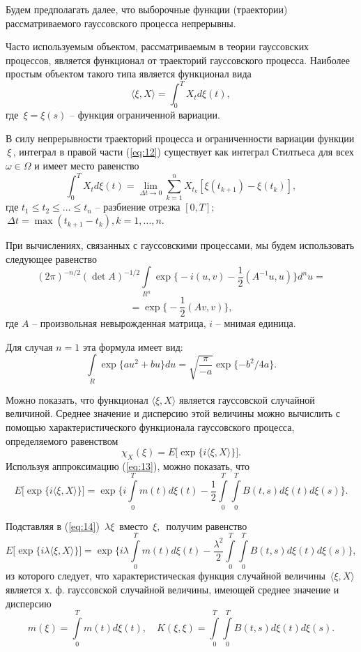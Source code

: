 \documentclass [12pt]{report}
\begin{document}
Будем предполагать далее, что выборочные функции (траектории) рассматриваемого
гауссовского процесса непрерывны.

  Часто используемым объектом, рассматриваемым в теории гауссовских процессов, является функционал
от траекторий гауссовского процесса. Наиболее простым
объектом такого типа является  функционал вида
\begin{equation}\label{eq:12}
\langle\xi,X\rangle=\int_0^T X_t d\xi(t),
\end{equation}
где $\,\xi=\xi(s)$ -- функция ограниченной вариации.

  В силу непрерывности траекторий
процесса и ограниченности вариации функции $\,\xi\,$, интеграл в правой
части (\ref{eq:12}) существует как интеграл Стилтьеса для всех $\omega\in \Omega$
и имеет место равенство
\begin{equation}\label{eq:13}
\int_0^T X_t d\xi(t)=\lim\limits_{\Delta t\rightarrow 0}
\sum\limits_{k=1}^n X_{t_k}[\xi(t_{k+1})-\xi(t_k)],
\end{equation}
где $t_1\leq t_2\leq\ldots\leq t_n$ -- разбиение отрезка $[0,T];$
$\,\Delta t=\max(t_{k+1}-t_k), k=1,\ldots,n.$

При вычислениях, связанных с гауссовскими процессами, мы будем использовать
следующее равенство
$$(2\pi)^{-n/2}(\det A)^{-1/2}
\int\limits_{R^n}\exp\Big\{-i(u,v)-\frac{1}{2}(A^{-1}u,u)\Big\} d^n u=$$
$$=\exp\Big\{-\frac{1}{2}(Av,v)\Big\},$$
где $A$ -- произвольная невырожденная матрица, $i$ -- мнимая единица.

Для случая $n=1$ эта формула имеет вид:
$$\int\limits_R \exp\{au^2+bu\}du=
\sqrt{\frac{\pi}{-a}}\exp\{-b^2/4a\}.$$

Можно показать, что функционал $\langle\xi,X\rangle$ является гауссовской
случайной величиной. Среднее значение и дисперсию этой величины
можно вычислить с помощью характеристического функционала гауссовского
процесса, определяемого равенством
$$\chi_X(\xi)=E\Big[\exp\Big\{i\langle\xi,X\rangle\Big\}\Big].$$
Используя аппроксимацию (\ref{eq:13}), можно показать, что
\begin{equation}\label{eq:14}
E\Big[\exp\Big\{i\langle\xi,X\rangle\Big\}\Big]=\exp\Big\{
i\int\limits_0^T m(t)d\xi(t)-\frac{1}{2}\int\limits_0^T\int\limits_0^T
B(t,s)d\xi(t)d\xi(s)\Big\}.
\end{equation}

Подставляя в (\ref{eq:14}) $\,\lambda\xi\,$ вместо $\,\xi,\,$ получим равенство
$$E\Big[\exp\Big\{i\lambda\langle\xi,X\rangle\Big\}\Big]=
\exp\Big\{
i\lambda\int\limits_0^T m(t)d\xi(t)-
\frac{\lambda^2}{2}\int\limits_0^T\int\limits_0^T
B(t,s)d\xi(t)d\xi(s)\Big\},$$
из которого следует, что характеристическая функция случайной величины
$\,\langle\xi,X\rangle\,$ является х. ф. гауссовской случайной величины,
имеющей среднее значение и дисперсию
$$m(\xi)=\int\limits_0^T m(t)d\xi(t),\quad
K(\xi,\xi)=\int\limits_0^T\int\limits_0^T
B(t,s)d\xi(t)d\xi(s).$$
\end{document}
